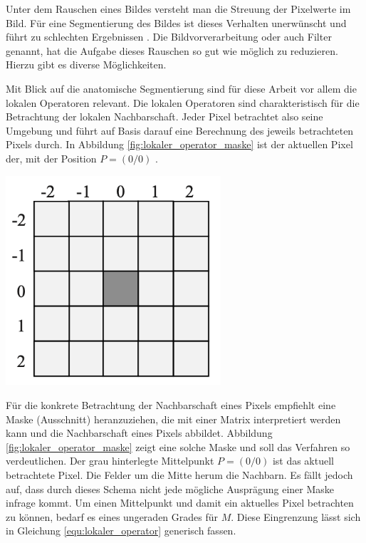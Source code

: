 Unter dem Rauschen eines Bildes versteht man die Streuung der Pixelwerte im Bild.
Für eine Segmentierung des Bildes ist dieses Verhalten unerwünscht und führt zu schlechten
Ergebnissen \citep[vgl.][S.~51]{handels2000}. Die Bildvorverarbeitung oder auch Filter
genannt, hat die Aufgabe dieses Rauschen so gut wie möglich zu reduzieren. Hierzu
gibt es diverse Möglichkeiten.

\begin{minipage}{0.40\textwidth}
	Mit Blick auf die anatomische Segmentierung sind für diese Arbeit vor allem die
	lokalen Operatoren relevant. Die lokalen Operatoren sind charakteristisch für
	die Betrachtung der lokalen Nachbarschaft. Jeder Pixel betrachtet also seine Umgebung
	und führt auf Basis darauf eine Berechnung des jeweils betrachteten Pixels durch.
	In Abbildung \ref{fig:lokaler_operator_maske} ist der aktuellen Pixel der, mit
	der Position $P = (0/0)$ \citep[vgl.][S.~52]{handels2000}.
\end{minipage}
\hfill
\begin{minipage}{0.50\textwidth}
	\centering
	\includegraphics[width=0.60\textwidth]{img/lokaler_operator_maske.jpg}
	\label{fig:lokaler_operator_maske}
\end{minipage}

Für die konkrete Betrachtung der Nachbarschaft eines Pixels empfiehlt \citet[S.~52]{handels2000}
eine Maske (Ausschnitt) heranzuziehen, die mit einer Matrix interpretiert werden
kann und die Nachbarschaft eines Pixels abbildet. Abbildung \ref{fig:lokaler_operator_maske}
zeigt eine solche Maske und soll das Verfahren so verdeutlichen. Der grau
hinterlegte Mittelpunkt $P = (0/0)$ ist das aktuell betrachtete Pixel. Die Felder
um die Mitte herum die Nachbarn. Es fällt jedoch auf, dass durch dieses Schema nicht
jede mögliche Ausprägung einer Maske infrage kommt. Um einen Mittelpunkt und
damit ein aktuelles Pixel betrachten zu können, bedarf es eines ungeraden Grades
für $M$. Diese Eingrenzung lässt sich in Gleichung \ref{equ:lokaler_operator}
generisch fassen.

